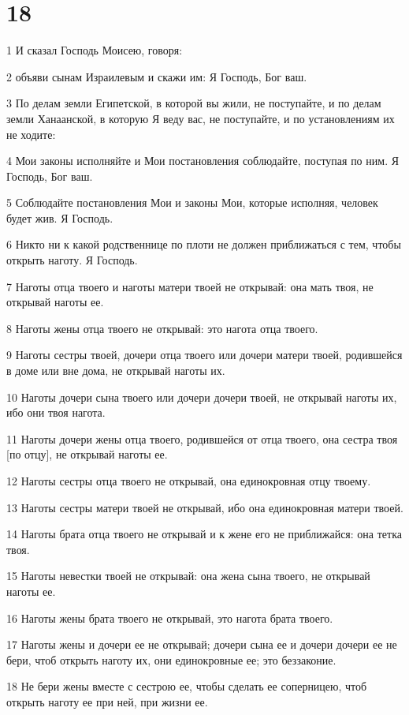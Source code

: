 \chapter{18}

\par 1 И сказал Господь Моисею, говоря:
\par 2 объяви сынам Израилевым и скажи им: Я Господь, Бог ваш.
\par 3 По делам земли Египетской, в которой вы жили, не поступайте, и по делам земли Ханаанской, в которую Я веду вас, не поступайте, и по установлениям их не ходите:
\par 4 Мои законы исполняйте и Мои постановления соблюдайте, поступая по ним. Я Господь, Бог ваш.
\par 5 Соблюдайте постановления Мои и законы Мои, которые исполняя, человек будет жив. Я Господь.
\par 6 Никто ни к какой родственнице по плоти не должен приближаться с тем, чтобы открыть наготу. Я Господь.
\par 7 Наготы отца твоего и наготы матери твоей не открывай: она мать твоя, не открывай наготы ее.
\par 8 Наготы жены отца твоего не открывай: это нагота отца твоего.
\par 9 Наготы сестры твоей, дочери отца твоего или дочери матери твоей, родившейся в доме или вне дома, не открывай наготы их.
\par 10 Наготы дочери сына твоего или дочери дочери твоей, не открывай наготы их, ибо они твоя нагота.
\par 11 Наготы дочери жены отца твоего, родившейся от отца твоего, она сестра твоя [по отцу], не открывай наготы ее.
\par 12 Наготы сестры отца твоего не открывай, она единокровная отцу твоему.
\par 13 Наготы сестры матери твоей не открывай, ибо она единокровная матери твоей.
\par 14 Наготы брата отца твоего не открывай и к жене его не приближайся: она тетка твоя.
\par 15 Наготы невестки твоей не открывай: она жена сына твоего, не открывай наготы ее.
\par 16 Наготы жены брата твоего не открывай, это нагота брата твоего.
\par 17 Наготы жены и дочери ее не открывай; дочери сына ее и дочери дочери ее не бери, чтоб открыть наготу их, они единокровные ее; это беззаконие.
\par 18 Не бери жены вместе с сестрою ее, чтобы сделать ее соперницею, чтоб открыть наготу ее при ней, при жизни ее.
